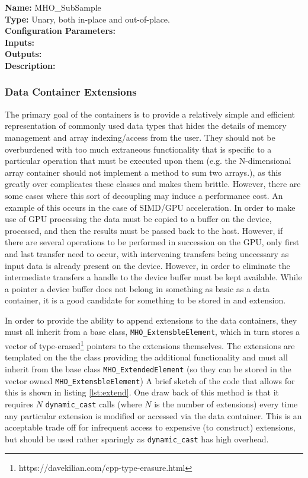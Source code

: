\noindent \textbf{Name:} MHO\_SubSample  \\
\textbf{Type:} Unary, both in-place and out-of-place. \\
\textbf{Configuration Parameters:} \\
\textbf{Inputs:} \\
\textbf{Outputs:} \\
\textbf{Description:} \\




\subsubsection{Data Container Extensions}

The primary goal of the containers is to provide a relatively simple and efficient representation of commonly used data types that hides the details of
memory management and array indexing/access from the user. They should not be overburdened with too much extraneous functionality that is specific to a particular operation that must be executed upon them (e.g. the N-dimensional array container should not implement a method to sum two arrays.), as this greatly
over complicates these classes and makes them brittle. However, there are some cases where this sort of decoupling may induce a performance cost. An example of
this occurs in the case of SIMD/GPU acceleration. In order to make use of GPU processing the data must be copied to a buffer on the device, processed, and then the results must be passed back to the host. However, if there are several operations to be performed in succession on the GPU, only first and last transfer
need to occur, with intervening transfers being unecessary as input data is already present on the device. However, in order to eliminate the intermediate transfers a handle to the device buffer must be kept available. While a pointer a device buffer does not belong in something as basic as a data container, it
is a good candidate for something to be stored in and extension.

In order to provide the ability to append extensions to the data containers, they must all inherit from a base class, \texttt{MHO\_ExtensbleElement}, which
in turn stores a vector of type-erased\footnote{https://davekilian.com/cpp-type-erasure.html} pointers to the extensions themselves. The extensions are templated on the the class providing the additional functionality and must all inherit from the base class \texttt{MHO\_ExtendedElement} (so they can be stored in the vector owned \texttt{MHO\_ExtensbleElement}) A brief sketch of the code that allows for this is shown in listing \ref{lst:extend}. One draw back of this method is that it requires $N$ \texttt{dynamic\_cast} calls (where $N$ is the number of extensions) every time any particular extension is modified or accessed via the data container. This is an acceptable trade off for infrequent access to expensive (to construct) extensions, but should be used rather sparingly as \texttt{dynamic\_cast} has high overhead.


